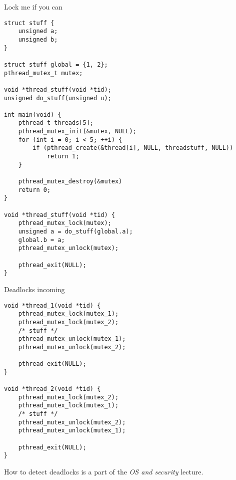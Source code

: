 \begin{frame}[fragile]{Lock me if you can}
    \begin{lstlisting}[basicstyle=\tiny]
struct stuff {
    unsigned a;
    unsigned b;
}

struct stuff global = {1, 2};
pthread_mutex_t mutex;

void *thread_stuff(void *tid);
unsigned do_stuff(unsigned u);

int main(void) {
    pthread_t threads[5];
    pthread_mutex_init(&mutex, NULL);
    for (int i = 0; i < 5; ++i) {
        if (pthread_create(&thread[i], NULL, threadstuff, NULL))
            return 1;
    }
    
    pthread_mutex_destroy(&mutex)
    return 0;
}

void *thread_stuff(void *tid) {
    pthread_mutex_lock(mutex);
    unsigned a = do_stuff(global.a);
    global.b = a;
    pthread_mutex_unlock(mutex);
    
    pthread_exit(NULL);
}
\end{lstlisting}
\end{frame}

\begin{frame}[fragile]{Deadlocks incoming}
     \begin{lstlisting}[basicstyle=\scriptsize]
void *thread_1(void *tid) {
    pthread_mutex_lock(mutex_1);
    pthread_mutex_lock(mutex_2);
    /* stuff */
    pthread_mutex_unlock(mutex_1);
    pthread_mutex_unlock(mutex_2);
    
    pthread_exit(NULL);
}

void *thread_2(void *tid) {
    pthread_mutex_lock(mutex_2);
    pthread_mutex_lock(mutex_1);
    /* stuff */
    pthread_mutex_unlock(mutex_2);
    pthread_mutex_unlock(mutex_1);
    
    pthread_exit(NULL);
}
	\end{lstlisting}
	How to detect deadlocks is a part of the \textit{OS and security} lecture.
\end{frame}


